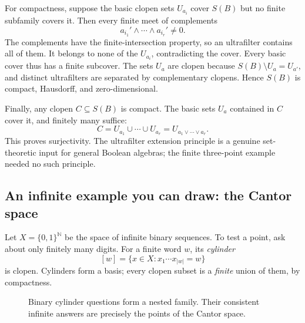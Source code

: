 For compactness, suppose the basic clopen sets $U_{a_i}$ cover $S(B)$ but no finite subfamily covers it. Then every finite meet of complements
\[
 a_{i_1}'\wedge\cdots\wedge a_{i_r}'\ne0.
\]
The complements have the finite-intersection property, so an ultrafilter contains all of them. It belongs to none of the $U_{a_i}$, contradicting the cover. Every basic cover thus has a finite subcover. The sets $U_a$ are clopen because $S(B)\setminus U_a=U_{a'}$, and distinct ultrafilters are separated by complementary clopens. Hence $S(B)$ is compact, Hausdorff, and zero-dimensional.

Finally, any clopen $C\subseteq S(B)$ is compact. The basic sets $U_a$ contained in $C$ cover it, and finitely many suffice:
\[
 C=U_{a_1}\cup\cdots\cup U_{a_r}
   =U_{a_1\vee\cdots\vee a_r}.
\]
This proves surjectivity. The ultrafilter extension principle is a genuine set-theoretic input for general Boolean algebras; the finite three-point example needed no such principle.

\subsection{An infinite example you can draw: the Cantor space}

Let $X=\{0,1\}^{\mathbb N}$ be the space of infinite binary sequences. To test a point, ask about only finitely many digits. For a finite word $w$, its \emph{cylinder}
\[
 [w]=\{x\in X:x_1\cdots x_{|w|}=w\}
\]
is clopen. Cylinders form a basis; every clopen subset is a \emph{finite} union of them, by compactness.

\begin{figure}[H]
\centering
{}
\caption{Binary cylinder questions form a nested family. Their consistent infinite answers are precisely the points of the Cantor space.}
\end{figure}

